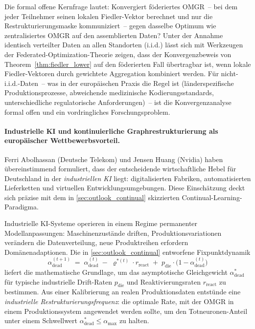 \documentclass[12pt, a4paper, openany]{report}
\begin{document}
Die formal offene Kernfrage lautet: Konvergiert föderiertes
OMGR~-- bei dem jeder Teilnehmer seinen lokalen Fiedler-Vektor
berechnet und nur die Restrukturierungsmaske kommuniziert~-- gegen
dasselbe Optimum wie zentralisiertes OMGR auf den assemblierten Daten?
Unter der Annahme identisch verteilter Daten an allen Standorten
(i.i.d.) lässt sich mit Werkzeugen der Federated-Optimization-Theorie
zeigen, dass der Konvergenzbeweis von Theorem~\ref{thm:fiedler_lower}
auf den föderierten Fall übertragbar ist, wenn lokale Fiedler-Vektoren
durch gewichtete Aggregation kombiniert werden.  Für
nicht-i.i.d.-Daten~-- was in der europäischen Praxis die Regel ist
(länderspezifische Produktionsprozesse, abweichende medizinische
Kodierungsstandards, unterschiedliche regulatorische Anforderungen)~--
ist die Konvergenzanalyse formal offen und ein vordringliches
Forschungsproblem.

\paragraph{Industrielle KI und kontinuierliche Graphrestrukturierung
  als europäischer Wettbewerbsvorteil.}
Ferri Abolhassan (Deutsche Telekom) und Jensen Huang (Nvidia) haben
übereinstimmend formuliert, dass der entscheidende wirtschaftliche
Hebel für Deutschland in der \emph{industriellen KI} liegt:
digitalisierten Fabriken, automatisierten Lieferketten und virtuellen
Entwicklungsumgebungen.  Diese Einschätzung deckt sich präzise mit dem
in \cref{sec:outlook_continual} skizzierten Continual-Learning-Paradigma.

Industrielle KI-Systeme operieren in einem Regime permanenter
Modellanpassungen: Maschinenzustände driften, Produktionsvariationen
verändern die Datenverteilung, neue Produktreihen erfordern
Domänenadaptionen.  Die in \cref{sec:outlook_continual} entworfene
Fixpunktdynamik
\[
  \alpha_{\mathrm{dead}}^{(t+1)}
  \;=\;
  \alpha_{\mathrm{dead}}^{(t)}
  \;-\; \varrho^{*(t)} \cdot r_{\mathrm{react}}
  \;+\; p_{\mathrm{die}} \cdot \bigl(1 - \alpha_{\mathrm{dead}}^{(t)}\bigr)
\]
liefert die mathematische Grundlage, um das asymptotische Gleichgewicht
$\alpha^*_{\mathrm{dead}}$ für typische industrielle Drift-Raten
$p_{\mathrm{die}}$ und Reaktivierungsraten $r_{\mathrm{react}}$ zu
bestimmen.  Aus einer Kalibrierung an realen Produktionsdaten entstünde
eine \emph{industrielle Restrukturierungsfrequenz}: die optimale Rate,
mit der OMGR in einem Produktionssystem angewendet werden sollte, um
den Totneuronen-Anteil unter einem Schwellwert
$\alpha^*_{\mathrm{dead}} \leq \alpha_{\max}$ zu halten.
\end{document}
